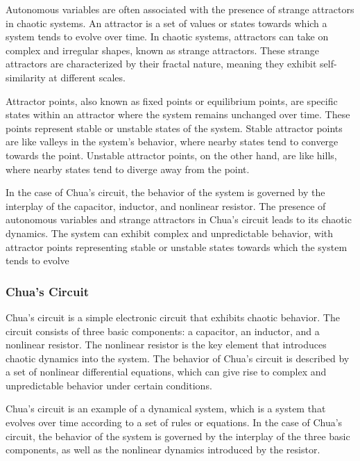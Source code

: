 \documentclass[12pt]{article}
\begin{document}
                Autonomous variables are often associated with the presence of strange attractors in chaotic systems. 
                An attractor is a set of values or states towards which a system tends to evolve over time. In chaotic 
                systems, attractors can take on complex and irregular shapes, known as strange attractors. These strange 
                attractors are characterized by their fractal nature, meaning they exhibit self-similarity at different scales.

                Attractor points, also known as fixed points or equilibrium points, are specific states within an attractor where 
                the system remains unchanged over time. These points represent stable or unstable states of the system. Stable 
                attractor points are like valleys in the system's behavior, where nearby states tend to converge towards the 
                point. Unstable attractor points, on the other hand, are like hills, where nearby states tend to diverge away 
                from the point.

                In the case of Chua's circuit, the behavior of the system is governed by the interplay of the capacitor, 
                inductor, and nonlinear resistor. The presence of autonomous variables and strange attractors in Chua's circuit 
                leads to its chaotic dynamics. The system can exhibit complex and unpredictable behavior, with attractor points 
                representing stable or unstable states towards which the system tends to evolve


                \subsubsection{Chua's Circuit}

                Chua's circuit is a simple electronic circuit that exhibits chaotic behavior. The circuit consists of
                three basic components: a capacitor, an inductor, and a nonlinear resistor. The nonlinear resistor 
                is the key element that introduces chaotic dynamics into the system. The behavior of Chua's circuit 
                is described by a set of nonlinear differential equations, which can give rise to complex and unpredictable 
                behavior under certain conditions.

                Chua's circuit is an example of a dynamical system, which is a system that evolves over time according to
                a set of rules or equations. In the case of Chua's circuit, the behavior of the system is governed by the
                interplay of the three basic components, as well as the nonlinear dynamics introduced by the resistor.
\end{document}
